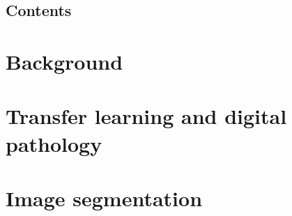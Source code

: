 % 
\pagestyle{empty}



\frontmatter





\chapter*{Contents}
\tableofcontents


\mainmatter
\pagestyle{scrheadings}



\part{Background}



\part{Transfer learning and digital pathology}



\part{Image segmentation}



\backmatter

\appendix


\newpage

\listoffigures
\listoftables

\printbibliography

